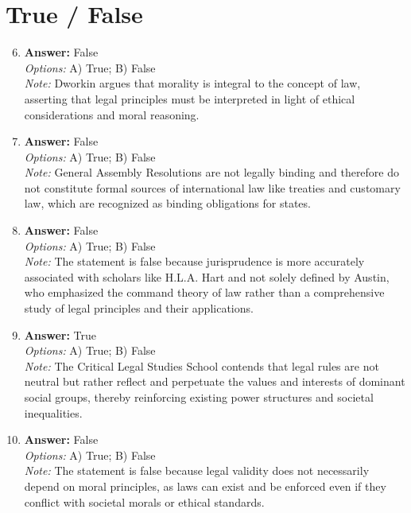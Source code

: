 \documentclass[12pt]{article}
\begin{document}
\section*{True / False}
\begin{enumerate}[label=\arabic*.]
\setcounter{enumi}{5}
\item \textbf{Answer:} False
\\ \textit{Options:} A) True; B) False
\\ \textit{Note:} Dworkin argues that morality is integral to the concept of law, asserting that legal principles must be interpreted in light of ethical considerations and moral reasoning.
\item \textbf{Answer:} False
\\ \textit{Options:} A) True; B) False
\\ \textit{Note:} General Assembly Resolutions are not legally binding and therefore do not constitute formal sources of international law like treaties and customary law, which are recognized as binding obligations for states.
\item \textbf{Answer:} False
\\ \textit{Options:} A) True; B) False
\\ \textit{Note:} The statement is false because jurisprudence is more accurately associated with scholars like H.L.A. Hart and not solely defined by Austin, who emphasized the command theory of law rather than a comprehensive study of legal principles and their applications.
\item \textbf{Answer:} True
\\ \textit{Options:} A) True; B) False
\\ \textit{Note:} The Critical Legal Studies School contends that legal rules are not neutral but rather reflect and perpetuate the values and interests of dominant social groups, thereby reinforcing existing power structures and societal inequalities.
\item \textbf{Answer:} False
\\ \textit{Options:} A) True; B) False
\\ \textit{Note:} The statement is false because legal validity does not necessarily depend on moral principles, as laws can exist and be enforced even if they conflict with societal morals or ethical standards.
\end{enumerate}
\end{document}
